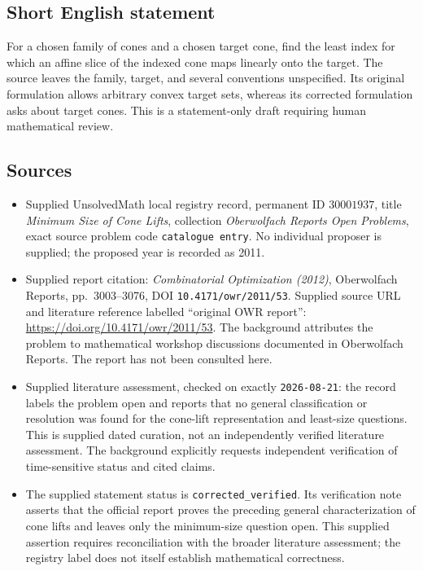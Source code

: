 \documentclass[11pt]{article}
\begin{document}
\subsection{Short English statement}
For a chosen family of cones and a chosen target cone, find the least index for which an affine slice of the indexed cone maps linearly onto the target. The source leaves the family, target, and several conventions unspecified. Its original formulation allows arbitrary convex target sets, whereas its corrected formulation asks about target cones. This is a statement-only draft requiring human mathematical review.
\subsection{Sources}
\begin{itemize}
\item Supplied UnsolvedMath local registry record, permanent ID \(30001937\), title \emph{Minimum Size of Cone Lifts}, collection \emph{Oberwolfach Reports Open Problems}, exact source problem code \texttt{catalogue entry}. No individual proposer is supplied; the proposed year is recorded as 2011.
\item Supplied report citation: \emph{Combinatorial Optimization (2012)}, Oberwolfach Reports, pp.\ 3003--3076, DOI \texttt{10.4171/owr/2011/53}. Supplied source URL and literature reference labelled ``original OWR report'': \url{https://doi.org/10.4171/owr/2011/53}. The background attributes the problem to mathematical workshop discussions documented in Oberwolfach Reports. The report has not been consulted here.
\item Supplied literature assessment, checked on exactly \texttt{2026-08-21}: the record labels the problem open and reports that no general classification or resolution was found for the cone-lift representation and least-size questions. This is supplied dated curation, not an independently verified literature assessment. The background explicitly requests independent verification of time-sensitive status and cited claims.
\item The supplied statement status is \texttt{corrected\_verified}. Its verification note asserts that the official report proves the preceding general characterization of cone lifts and leaves only the minimum-size question open. This supplied assertion requires reconciliation with the broader literature assessment; the registry label does not itself establish mathematical correctness.
\end{itemize}
\end{document}
